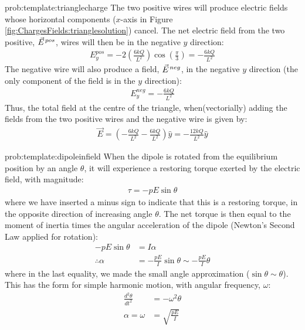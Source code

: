 \begin{solution}{prob:template:trianglecharge}
The two positive wires will produce electric fields whose horizontal components ($x$-axis in Figure \ref{fig:ChargesFields:trianglesolution}) cancel. The net electric field from the two positive, $\pvec E^{pos}$, wires will then be in the negative $y$ direction:
\begin{align*}
E_{y}^{pos}=-2 \left( \frac{6kQ}{L^2}  \right) \cos\left(\frac{\pi}{3} \right)=-\frac{6kQ}{L^2}
\end{align*}
The negative wire will also produce a field, $\pvec E^{neg}$, in the negative $y$ direction (the only component of the field is in the $y$ direction):
\begin{align*}
E_{y}^{neg}=- \frac{6kQ}{L^2}
\end{align*}
Thus, the total field at the centre of the triangle, when(vectorially) adding the fields from the two positive wires and the negative wire is given by:
\begin{align*}
\vec E = \left(-\frac{6kQ}{L^2} - \frac{6kQ}{L^2} \right)\hat y=- \frac{12kQ}{L^2}\hat y
\end{align*}
\end{solution}


\begin{solution}{prob:template:dipoleinfield}\label{soln:template:dipoleinfield}
When the dipole is rotated from the equilibrium position by an angle $\theta$, it will experience a restoring torque exerted by the electric field, with magnitude:
\begin{align*}
\tau = -pE\sin\theta 
\end{align*}
where we have inserted a minus sign to indicate that this is a restoring torque, in the opposite direction of increasing angle $\theta$. The net torque is then equal to the moment of inertia times the angular acceleration of the dipole (Newton's Second Law applied for rotation):
\begin{align*}
-pE\sin\theta &= I\alpha\\
\therefore \alpha &= -\frac{pE}{I}\sin\theta\sim-\frac{pE}{I}\theta
\end{align*}
where in the last equality, we made the small angle approximation ($\sin\theta\sim\theta$). This has the form for simple harmonic motion, with angular frequency, $\omega$:
\begin{align*}
\frac{d^2\theta}{dt^2}&=-\omega^2 \theta\\
\alpha=\omega &=\sqrt{\frac{pE}{I}}
\end{align*}
\end{solution}

